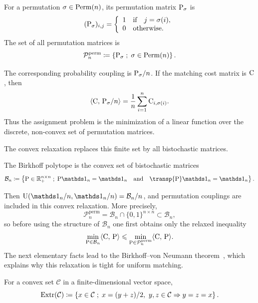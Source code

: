 \begin{defn}\label{def-permutation-matrices}
	For a permutation $\sigma\in\Perm(n)$, its permutation matrix $\P_\sigma$ is
	\[
		(\P_\sigma)_{i,j}=\choice{1 \qifq j=\sigma(i),\\ 0 \quad\text{otherwise}.}
	\]
	The set of all permutation matrices is
	\[
		\mathcal P_n^{\mathrm{perm}}
		\eqdef
		\enscond{\P_\sigma}{\sigma\in\Perm(n)}.
	\]
\end{defn}
The corresponding probability coupling is $\P_\sigma/n$. If the matching cost matrix is $\C$, then
\[
	\dotp{\C}{\P_\sigma/n}=\frac1n\sum_{i=1}^n \C_{i,\sigma(i)}.
\]
Thus the assignment problem is the minimization of a linear function over the discrete, non-convex set of permutation matrices.

The convex relaxation replaces this finite set by all bistochastic matrices.

\begin{defn}\label{def-birkhoff-polytope}
	The Birkhoff polytope is the convex set of bistochastic matrices
	\[
		\mathcal B_n
		\eqdef
		\enscond{\P\in\RR_+^{n\times n}}{\P\ones_n=\ones_n \qandq \transp{\P}\ones_n=\ones_n}.
	\]
\end{defn}
Then $\CouplingsD(\ones_n/n,\ones_n/n)=\mathcal B_n/n$, and permutation couplings are included in this convex relaxation. More precisely,
\[
	\mathcal P_n^{\mathrm{perm}}
	=
	\mathcal B_n\cap\{0,1\}^{n\times n}
	\subset
	\mathcal B_n,
\]
so before using the structure of $\mathcal B_n$ one first obtains only the relaxed inequality
\[
	\min_{\P\in\mathcal B_n}\dotp{\C}{\P}
	\leq
	\min_{\P\in\mathcal P_n^{\mathrm{perm}}}\dotp{\C}{\P}.
\]
The next elementary facts lead to the Birkhoff--von Neumann theorem~\cite{birkhoff,vonNeumann1953assignment}, which explains why this relaxation is tight for uniform matching.

\begin{defn}\label{def-extreme-points}
		For a convex set $\mathcal C$ in a finite-dimensional vector space,
	\[
		\operatorname{Extr}(\mathcal C)
		\eqdef
		\enscond{x\in\mathcal C}{x=(y+z)/2,\ y,z\in\mathcal C \Rightarrow y=z=x}.
	\]
\end{defn}

